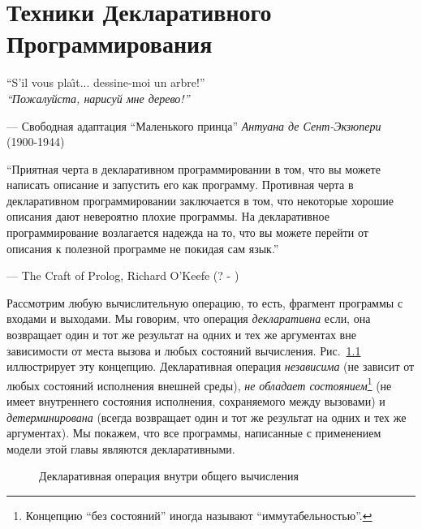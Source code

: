 \chapter{Техники Декларативного Программирования}

\epigraph{``S’il vous pla\^\i t... dessine-moi un arbre!'' \\
  \emph{``Пожалуйста, нарисуй мне дерево!''}}{--- Свободная адаптация ``Маленького принца'' \emph{Антуана де Сент-Экзюпери} (1900-1944)}

\epigraph{``Приятная черта в декларативном программировании в том, что вы можете написать описание и запустить его как программу. Противная черта в декларативном программировании заключается в том, что некоторые хорошие описания дают невероятно плохие программы. На декларативное программирование возлагается надежда на то, что вы можете перейти от описания к полезной программе не покидая сам язык.''}{--- The Craft of Prolog, Richard O'Keefe (? - )}

Рассмотрим любую вычислительную операцию, то есть, фрагмент программы с входами и выходами. Мы говорим, что операция \emph{декларативна} если, она возвращает один и тот же результат на одних и тех же аргументах вне зависимости от места вызова и любых состояний вычисления. Рис.~\ref{figure:Declarative_inside_general} иллюстрирует эту концепцию. Декларативная операция \emph{независима} (не зависит от любых состояний исполнения внешней среды), \emph{не обладает состоянием}\footnote{Концепцию ``без состояний'' иногда называют ``иммутабельностью''.} (не имеет внутреннего состояния исполнения, сохраняемого между вызовами) и \emph{детерминирована} (всегда возвращает один и тот же результат на одних и тех же аргументах). Мы покажем, что все программы, написанные с применением модели этой главы являются декларативными.

\begin{figure}
  \caption{Декларативная операция внутри общего вычисления}
  \label{figure:Declarative_inside_general}
\end{figure}

